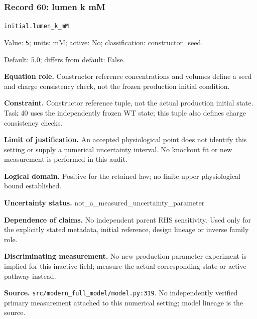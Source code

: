 \subsubsection*{Record 60: lumen k mM}
{\small \nolinkurl{initial.lumen_k_mM}\par

Value: \texttt{5}; units: mM; active: No; classification: constructor\_seed.\par

Default: 5.0; differs from default: False.\par

\textbf{Equation role.} Constructor reference concentrations and volumes define a seed and charge consistency check, not the frozen production initial condition.\par

\textbf{Constraint.} Constructor reference tuple, not the actual production initial state. Task 40 uses the independently frozen WT state; this tuple also defines charge consistency checks.\par

\textbf{Limit of justification.} An accepted physiological point does not identify this setting or supply a numerical uncertainty interval. No knockout fit or new measurement is performed in this audit.\par

\textbf{Logical domain.} Positive for the retained law; no finite upper physiological bound established.\par

\textbf{Uncertainty status.} not\_a\_measured\_uncertainty\_parameter\par

\textbf{Dependence of claims.} No independent parent RHS sensitivity. Used only for the explicitly stated metadata, initial reference, design lineage or inverse family role.\par

\textbf{Discriminating measurement.} No new production parameter experiment is implied for this inactive field; measure the actual corresponding state or active pathway instead.\par

\textbf{Source.} \nolinkurl{src/modern_full_model/model.py:319}. No independently verified primary measurement attached to this numerical setting; model lineage is the source.\par}

